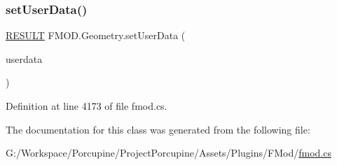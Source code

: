 \subsubsection{\texorpdfstring{set\+User\+Data()}{setUserData()}}
{\footnotesize\ttfamily \hyperlink{namespace_f_m_o_d_a305d1176ef3f8c8815861a60407ac33d}{R\+E\+S\+U\+LT} F\+M\+O\+D.\+Geometry.\+set\+User\+Data (\begin{DoxyParamCaption}\item[{Int\+Ptr}]{userdata }\end{DoxyParamCaption})}



Definition at line 4173 of file fmod.\+cs.



The documentation for this class was generated from the following file\+:\begin{DoxyCompactItemize}
\item 
G\+:/\+Workspace/\+Porcupine/\+Project\+Porcupine/\+Assets/\+Plugins/\+F\+Mod/\hyperlink{fmod_8cs}{fmod.\+cs}\end{DoxyCompactItemize}
